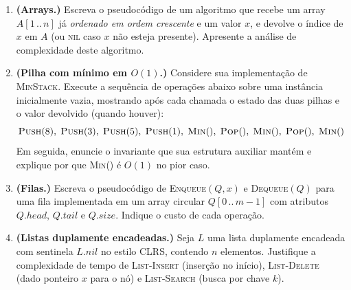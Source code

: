 \documentclass[9pt,a4paper]{extarticle}
\begin{document}
\begin{enumerate}[label=\textbf{\arabic*.}, leftmargin=*, itemsep=2em]

\item \textbf{(Arrays.)}
  Escreva o pseudocódigo de um algoritmo que recebe um array \(A[1\,..\,n]\) já
  \emph{ordenado em ordem crescente} e um valor \(x\), e devolve o índice de
  \(x\) em \(A\) (ou \textsc{nil} caso \(x\) não esteja presente). Apresente a análise de complexidade deste algoritmo.
  
\item \textbf{(Pilha com mínimo em \(O(1)\).)}
  Considere sua implementação de \textsc{MinStack}.
  Execute a sequência de operações abaixo sobre uma instância inicialmente vazia,
  mostrando após cada chamada o estado das duas pilhas e o valor devolvido
  (quando houver):
  \[
    \textsc{Push}(8),\;
    \textsc{Push}(3),\;
    \textsc{Push}(5),\;
    \textsc{Push}(1),\;
    \textsc{Min}(),\;
    \textsc{Pop}(),\;
    \textsc{Min}(),\;
    \textsc{Pop}(),\;
    \textsc{Min}()
  \]
  Em seguida, enuncie o invariante que sua estrutura auxiliar mantém e explique
  por que \textsc{Min}() é \(O(1)\) no pior caso.
\item \textbf{(Filas.)}
  Escreva o pseudocódigo de \textsc{Enqueue}$(Q, x)$ e \textsc{Dequeue}$(Q)$ para
  uma fila implementada em um array circular \(Q[0\,..\,m-1]\) com atributos
  \(Q.\mathit{head}\), \(Q.\mathit{tail}\) e \(Q.\mathit{size}\). Indique o custo de cada operação.

\item \textbf{(Listas duplamente encadeadas.)}
  Seja \(L\) uma lista duplamente encadeada com sentinela \(L.\mathit{nil}\) no
  estilo CLRS, contendo \(n\) elementos.
  Justifique a complexidade de tempo de \textsc{List-Insert} (inserção no início),
  \textsc{List-Delete} (dado ponteiro \(x\) para o nó) e \textsc{List-Search}
  (busca por chave \(k\)).


\end{enumerate}
\end{document}

